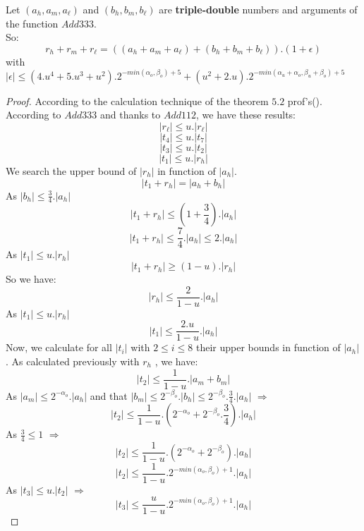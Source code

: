 \begin{theo}

Let  $(a_h,a_m,a_{\ell})$ and $(b_h,b_m,b_{\ell})$ are \textbf{triple-double} numbers and arguments of the function $Add333$.\\
So:\\
$$r_h +r_m +r_{\ell} = ((a_h+ a_m +a_{\ell})+(b_h+ b_m +b_{\ell})).(1+\epsilon)$$ with $\lvert \epsilon \rvert \le (4.u^4 + 5.u^3+ u^2).2^{-min(\alpha_o,\beta_o)+5}  + (u^2+2.u).2^{-min(\alpha_u +\alpha_o,\beta_u +\beta_o)+5}$
\end{theo}

\begin{proof} \color{-yellow}
According to the calculation technique of the theorem $5.2$ prof's(\cite{lauter2005basic}).\\
According to $Add333$ and thanks to $Add112$, we have these results:
$$\lvert r_{\ell} \rvert \le u. \lvert r_{\ell} \rvert$$
$$\lvert t_4 \rvert \le u. \lvert t_7 \rvert$$
$$\lvert t_3 \rvert \le u. \lvert t_2 \rvert$$
$$\lvert t_1 \rvert \le u. \lvert r_h \rvert$$
We search the upper bound of $\lvert r_h \rvert$ in function of $\lvert a_h \rvert$.
$$\lvert t_1 +r_h \rvert = \lvert a_h +b_h \rvert$$
As $\lvert b_h \rvert \le \frac{3}{4}. \lvert a_h \rvert$
$$\lvert t_1 +r_h \rvert \le (1+ \frac{3}{4}) . \lvert a_h  \rvert$$
$$\lvert t_1 +r_h \rvert \le \frac{7}{4} . \lvert a_h  \rvert \le 2 . \lvert a_h  \rvert$$
As $\lvert t_1 \rvert \le u. \lvert r_h \rvert$
$$\lvert t_1 +r_h \rvert \ge (1- u) . \lvert r_h  \rvert$$
So we have:
$$\lvert r_h \rvert \le \frac{2}{1-u}. \lvert a_h \rvert$$
As $\lvert t_1 \rvert \le u. \lvert r_h \rvert$
$$\lvert t_1 \rvert \le \frac{2.u}{1-u}. \lvert a_h \rvert$$
Now, we calculate for all $\lvert t_i \rvert $ with $2\le i \le 8$ their upper bounds in function of $\lvert a_h \rvert$.
As calculated previously with $r_h$ , we have:
$$\lvert t_2 \rvert \le \frac{1}{1-u}. \lvert a_m + b_m \rvert $$
As $\lvert a_m \rvert \le 2^{-\alpha_o}.\lvert a_h \rvert$ and that $\lvert b_m \rvert \le 2^{-\beta_o}.\lvert b_h \rvert \le 2^{-\beta_o}.\frac{3}{4}.\lvert a_h \rvert$ 
$\Rightarrow$
$$\lvert t_2 \rvert \le \frac{1}{1-u}.(2^{-\alpha_o} + 2^{-\beta_o}.\frac{3}{4}). \lvert a_h \rvert $$
As $\frac{3}{4} \le 1$ $\Rightarrow$
$$\lvert t_2 \rvert \le \frac{1}{1-u}.(2^{-\alpha_o} + 2^{-\beta_o}). \lvert a_h \rvert $$
$$\lvert t_2 \rvert \le \frac{1}{1-u}.2^{-min(\alpha_o,\beta_o)+1} . \lvert a_h \rvert $$
As $\lvert t_3 \rvert \le u. \lvert t_2 \rvert $ $\Rightarrow$
$$\lvert t_3 \rvert \le \frac{u}{1-u}.2^{-min(\alpha_o,\beta_o)+1}. \lvert a_h \rvert $$

\end{proof}
